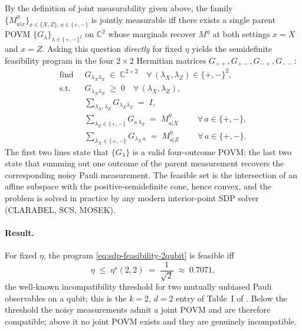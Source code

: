 \documentclass[oneside, a4paper, onecolumn, 11pt]{article}
\theoremstyle{definition}
\theoremstyle{plain}
\theoremstyle{remark}
\begin{document}
By the definition of joint measurability given above, the family
$\{M^{\eta}_{a|x}\}_{x \in \{X,Z\},\, a \in \{+,-\}}$ is jointly
measurable iff there exists a single parent POVM
$\{G_{\lambda}\}_{\lambda \in \{+,-\}^{2}}$ on $\mathbb{C}^{2}$
whose marginals recover $M^{\eta}$ at both settings $x = X$ and
$x = Z$. Asking this question \emph{directly} for fixed $\eta$ yields
the semidefinite feasibility program in the four $2{\times}2$
Hermitian matrices $G_{++}, G_{+-}, G_{-+}, G_{--}$:
\begin{equation}
\begin{aligned}
  \text{find}   \;\;& G_{\lambda_X \lambda_Z} \;\in\; \mathbb{C}^{2 \times 2}
                      \quad \forall\, (\lambda_X, \lambda_Z)
                      \in \{+, -\}^{2}, \\[2pt]
  \text{s.t.}   \;\;& G_{\lambda_X \lambda_Z} \;\geq\; 0
                      \quad \forall\, (\lambda_X, \lambda_Z), \\[2pt]
                  \;\;& \sum_{\lambda_X, \lambda_Z}
                        G_{\lambda_X \lambda_Z} \;=\; I, \\[2pt]
                  \;\;& \sum_{\lambda_Z \in \{+,-\}}
                        G_{a\,\lambda_Z} \;=\; M^{\eta}_{a | X}
                        \qquad\; \forall\, a \in \{+, -\}, \\[2pt]
                  \;\;& \sum_{\lambda_X \in \{+,-\}}
                        G_{\lambda_X\, a} \;=\; M^{\eta}_{a | Z}
                        \qquad\; \forall\, a \in \{+, -\}.
\end{aligned}
\label{eq:sdp-feasibility-2qubit}
\end{equation}
The first two lines state that $\{G_{\lambda}\}$ is a valid four-outcome
POVM; the last two state that summing out one outcome of the parent
measurement recovers the corresponding noisy Pauli measurement. The
feasible set is the intersection of an affine subspace with the
positive-semidefinite cone, hence convex, and the problem is solved in
practice by any modern interior-point SDP solver (CLARABEL, SCS,
MOSEK).

\paragraph{Result.} For fixed $\eta$, the program
\eqref{eq:sdp-feasibility-2qubit} is feasible iff
\begin{equation}
  \eta \;\le\; \eta^{\star}(2, 2) \;=\; \frac{1}{\sqrt{2}}
        \;\approx\; 0.7071,
  \label{eq:threshold-2qubit}
\end{equation}
the well-known incompatibility threshold for two mutually unbiased Pauli
observables on a qubit; this is the $k = 2$, $d = 2$ entry of Table~I of
\cite{Designolle2019}. Below the threshold the noisy measurements admit
a joint POVM and are therefore compatible; above it no joint POVM
exists and they are genuinely incompatible.
\end{document}
